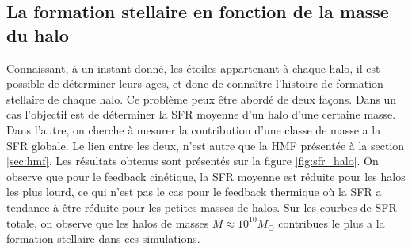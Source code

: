 \subsection{La formation stellaire en fonction de la masse du halo}
\label{sec:sfr_halo}
Connaissant, à un instant donné, les étoiles appartenant à chaque halo, il est possible de déterminer leurs ages, et donc de connaître l'histoire de formation stellaire de chaque halo.
Ce problème peux être abordé de deux façons.
Dans un cas l'objectif est de déterminer la \ac{SFR} moyenne d'un halo d'une certaine masse.
Dans l'autre, on cherche à mesurer la contribution d'une classe de masse a la \ac{SFR} globale.
Le lien entre les deux, n'est autre que la \ac{HMF} présentée à la section \ref{sec:hmf}.
Les résultats obtenus sont présentés sur la figure \ref{fig:sfr_halo}.
On observe que pour le feedback cinétique, la \ac{SFR} moyenne est réduite pour les halos les plus lourd, ce qui n'est pas le cas pour le feedback thermique où la \ac{SFR} a tendance à être réduite pour les petites masses de halos.
Sur les courbes de \ac{SFR} totale, on observe que les halos de masses $M\approx10^{10}M_\odot$ contribues le plus a la formation stellaire dans ces simulations.

